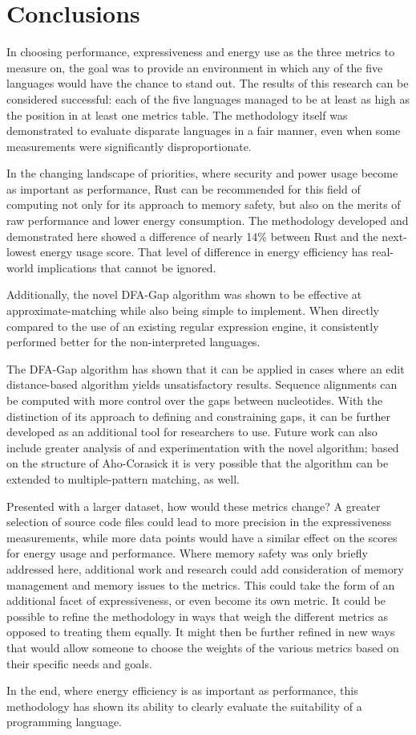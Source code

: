 \section{Conclusions}
\label{sec:conclusions}

In choosing performance, expressiveness and energy use as the three metrics to measure on, the goal was to provide an environment in which any of the five languages would have the chance to stand out. The results of this research can be considered successful: each of the five languages managed to be at least as high as the  position in at least one metrics table. The methodology itself was demonstrated to evaluate disparate languages in a fair manner, even when some measurements were significantly disproportionate.

In the changing landscape of priorities, where security and power usage become as important as performance, Rust can be recommended for this field of computing not only for its approach to memory safety, but also on the merits of raw performance and lower energy consumption. The methodology developed and demonstrated here showed a difference of nearly 14\% between Rust and the next-lowest energy usage score. That level of difference in energy efficiency has real-world implications that cannot be ignored.

Additionally, the novel DFA-Gap algorithm was shown to be effective at approximate-matching while also being simple to implement. When directly compared to the use of an existing regular expression engine, it consistently performed better for the non-interpreted languages.

The DFA-Gap algorithm has shown that it can be applied in cases where an edit distance-based algorithm yields unsatisfactory results. Sequence alignments can be computed with more control over the gaps between nucleotides. With the distinction of its approach to defining and constraining gaps, it can be further developed as an additional tool for researchers to use. Future work can also include greater analysis of and experimentation with the novel algorithm; based on the structure of Aho-Corasick it is very possible that the algorithm can be extended to multiple-pattern matching, as well.

Presented with a larger dataset, how would these metrics change? A greater selection of source code files could lead to more precision in the expressiveness measurements, while more data points would have a similar effect on the scores for energy usage and performance. Where memory safety was only briefly addressed here, additional work and research could add consideration of memory management and memory issues to the metrics. This could take the form of an additional facet of expressiveness, or even become its own metric. It could be possible to refine the methodology in ways that weigh the different metrics as opposed to treating them equally. It might then be further refined in new ways that would allow someone to choose the weights of the various metrics based on their specific needs and goals.

In the end, where energy efficiency is as important as performance, this methodology has shown its ability to clearly evaluate the suitability of a programming language.
